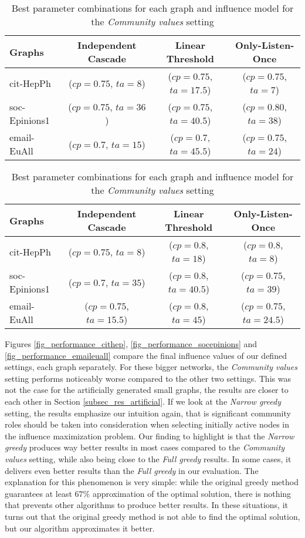 \documentclass[pdflatex,sn-mathphys-num]{sn-jnl}
\begin{document}
\begin{table}[ht]
\caption{Best parameter combinations for each graph and influence model for the \textit{Narrow greedy} setting}
\label{table_best_combinations_narrow_big}
\centering
\begin{tabular}{@{}l|ccc@{}}
\toprule
Graphs & Independent Cascade & Linear Threshold & Only-Listen-Once \\
\midrule
cit-HepPh & ($cp=0.75$, $ta=8$) & ($cp=0.75$, $ta=17.5$) & ($cp=0.75$, $ta=7$) \\
soc-Epinions1 & ($cp=0.75$, $ta=36$) & ($cp=0.75$, $ta=40.5$) & ($cp=0.80$, $ta=38$) \\
email-EuAll & ($cp=0.7$, $ta=15$) & ($cp=0.7$, $ta=45.5$) & ($cp=0.75$, $ta=24$) \\
\bottomrule
\end{tabular}
\vspace{5mm}
\caption{Best parameter combinations for each graph and influence model for the \textit{Community values} setting}
\label{table_best_combinations_community_values_big}
\centering
\begin{tabular}{@{}l|ccc@{}}
\toprule
Graphs & Independent Cascade & Linear Threshold & Only-Listen-Once \\
\midrule
cit-HepPh & ($cp=0.75$, $ta=8$) & ($cp=0.8$, $ta=18$) & ($cp=0.8$, $ta=8$) \\
soc-Epinions1 & ($cp=0.7$, $ta=35$) & ($cp=0.8$, $ta=40.5$) & ($cp=0.75$, $ta=39$) \\
email-EuAll & ($cp=0.75$, $ta=15.5$) & ($cp=0.8$, $ta=45$) & ($cp=0.75$, $ta=24.5$) \\
\bottomrule
\end{tabular}
\end{table}

Figures \ref{fig_performance_cithep}, \ref{fig_performance_socepinions} and \ref{fig_performance_emaileuall} compare the final influence values of our defined settings, each graph separately. For these bigger networks, the \textit{Community values} setting performs noticeably worse compared to the other two settings. This was not the case for the artificially generated small graphs, the results are closer to each other in Section \ref{subsec_res_artificial}. If we look at the \textit{Narrow greedy} setting, the results emphasize our intuition again, that is significant community roles should be taken into consideration when selecting initially active nodes in the influence maximization problem. Our finding to highlight is that the \textit{Narrow greedy} produces way better results in most cases compared to the \textit{Community values} setting, while also being close to the \textit{Full greedy} results. In some cases, it delivers even better results than the \textit{Full greedy} in our evaluation. The explanation for this phenomenon is very simple: while the original greedy method guarantees at least $67\%$ approximation of the optimal solution, there is nothing that prevents other algorithms to produce better results. In these situations, it turns out that the original greedy method is not able to find the optimal solution, but our algorithm approximates it better.
\end{document}
